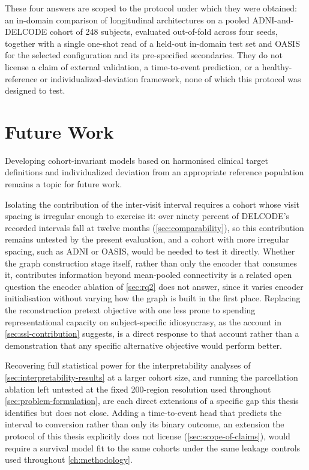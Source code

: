 These four answers are scoped to the protocol under which they were obtained: an in-domain
comparison of longitudinal architectures on a pooled \ac{ADNI}-and-\ac{DELCODE} cohort of
248 subjects, evaluated out-of-fold across four seeds, together with a single one-shot read
of a held-out in-domain test set and \ac{OASIS} for the selected configuration and its
pre-specified secondaries. They do not license a claim of external validation, a
time-to-event prediction, or a healthy-reference or individualized-deviation framework,
none of which this protocol was designed to test.

\section{Future Work}\label{sec:future-work}

Developing cohort-invariant models based on harmonised clinical target definitions and
individualized deviation from an appropriate reference population remains a topic for
future work.

Isolating the contribution of the inter-visit interval requires a cohort whose visit
spacing is irregular enough to exercise it: over ninety percent of \ac{DELCODE}'s recorded
intervals fall at twelve months (\autoref{sec:comparability}), so this contribution remains
untested by the present evaluation, and a cohort with more irregular spacing, such as
\ac{ADNI} or \ac{OASIS}, would be needed to test it directly. Whether the graph
construction stage itself, rather than only the encoder that consumes it, contributes
information beyond mean-pooled connectivity is a related open question the encoder
ablation of \autoref{sec:rq2} does not answer, since it varies encoder initialisation
without varying how the graph is built in the first place. Replacing the reconstruction
pretext objective with one less prone to spending representational capacity on
subject-specific idiosyncrasy, as the account in \autoref{sec:ssl-contribution} suggests,
is a direct response to that account rather than a demonstration that any specific
alternative objective would perform better.

Recovering full statistical power for the interpretability analyses of
\autoref{sec:interpretability-results} at a larger cohort size, and running the
parcellation ablation left untested at the fixed 200-region resolution used throughout
\autoref{sec:problem-formulation}, are each direct extensions of a specific gap this thesis
identifies but does not close. Adding a time-to-event head that predicts the interval to
conversion rather than only its binary outcome, an extension the protocol of this thesis
explicitly does not license (\autoref{sec:scope-of-claims}), would require a survival model
fit to the same cohorts under the same leakage controls used throughout
\autoref{ch:methodology}.

